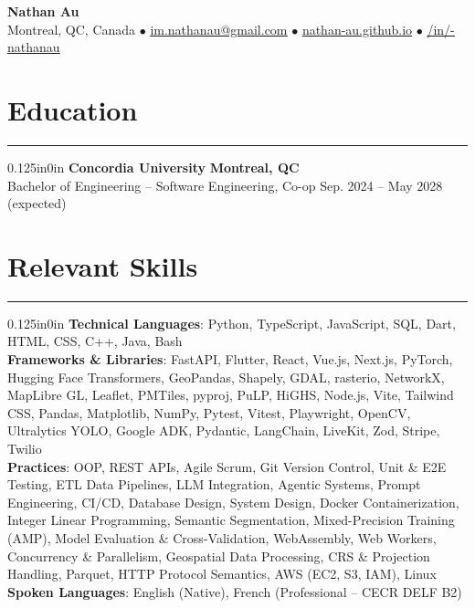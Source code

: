 \documentclass[11pt]{article}
\begin{document}
    \pagestyle{empty}

    \begin{center}
        \textbf{\LARGE Nathan Au}\\[0.4em]
        Montreal, QC, Canada 
        $\bullet$
        \href{im.nathanau@gmail.com}{\underline{im.nathanau@gmail.com}} 
        $\bullet$ 
        \href{https://nathan-au.github.io}{\underline{nathan-au.github.io}}
        $\bullet$ 
        \href{https://www.linkedin.com/in/-nathanau/}{\underline{/in/-nathanau}}
    \end{center}

    \vspace{-1.0em}

    \section*{\large Education}
    \hrule 
    \vspace{0.4em}
    \begin{adjustwidth}{0.125in}{0in}
        \textbf{Concordia University} \hfill \textbf{Montreal, QC}\\
        Bachelor of Engineering -- Software Engineering, Co-op \hfill Sep. 2024 -- May 2028 (expected)
    \end{adjustwidth}

    \section*{\large Relevant Skills}
    \hrule 
    \vspace{0.4em}
    \begin{adjustwidth}{0.125in}{0in}
        \sloppy
        \textbf{Technical Languages}: Python, TypeScript, JavaScript, SQL, Dart, HTML, CSS, C++, Java, Bash\\
        \textbf{Frameworks \& Libraries}: FastAPI, Flutter, React, Vue.js, Next.js, PyTorch, Hugging Face Transformers, GeoPandas, Shapely, GDAL, rasterio, NetworkX, MapLibre GL, Leaflet, PMTiles, pyproj, PuLP, HiGHS, Node.js, Vite, Tailwind CSS, Pandas, Matplotlib, NumPy, Pytest, Vitest, Playwright, OpenCV, Ultralytics YOLO, Google ADK, Pydantic, LangChain, LiveKit, Zod, Stripe, Twilio\\
        \textbf{Practices}: OOP, REST APIs, Agile Scrum, Git Version Control, Unit \& E2E Testing, ETL Data Pipelines, LLM Integration, Agentic Systems, Prompt Engineering, CI/CD, Database Design, System Design, Docker Containerization, Integer Linear Programming, Semantic Segmentation, Mixed-Precision Training (AMP), Model Evaluation \& Cross-Validation, WebAssembly, Web Workers, Concurrency \& Parallelism, Geospatial Data Processing, CRS \& Projection Handling, Parquet, HTTP Protocol Semantics, AWS (EC2, S3, IAM), Linux\\
        \textbf{Spoken Languages}: English (Native), French (Professional -- CECR DELF B2)
    \end{adjustwidth}
\end{document}
